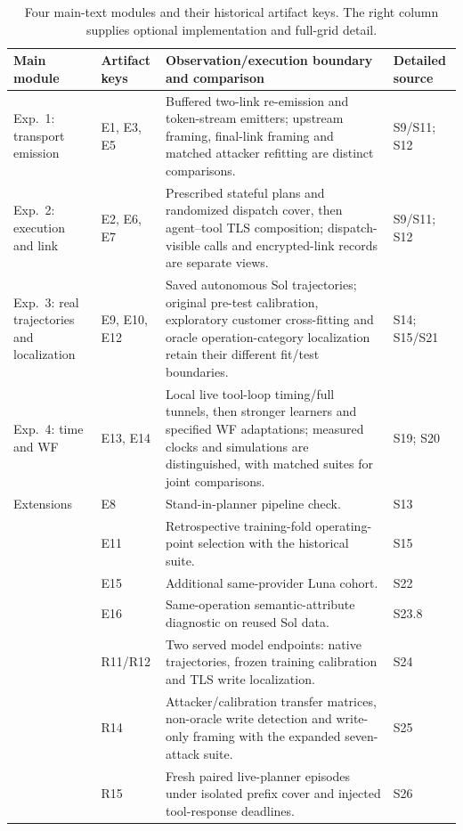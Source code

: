 \begin{table}[!t]\centering\footnotesize
\caption{Four main-text modules and their historical artifact keys. The right column supplies optional implementation and full-grid detail.}\label{tab:r9-experiment-index}
\begin{tabularx}{\textwidth}{@{}p{}p{}Xp{}@{}}\toprule
Main module & Artifact keys & Observation/execution boundary and comparison & Detailed source\\\midrule
Exp.\ 1: transport emission & E1, E3, E5 & Buffered two-link re-emission and token-stream emitters; upstream framing, final-link framing and matched attacker refitting are distinct comparisons. & S9/S11; S12\\
Exp.\ 2: execution and link & E2, E6, E7 & Prescribed stateful plans and randomized dispatch cover, then agent--tool TLS composition; dispatch-visible calls and encrypted-link records are separate views. & S9/S11; S12\\
Exp.\ 3: real trajectories and localization & E9, E10, E12 & Saved autonomous Sol trajectories; original pre-test calibration, exploratory customer cross-fitting and oracle operation-category localization retain their different fit/test boundaries. & S14; S15/S21\\
Exp.\ 4: time and WF & E13, E14 & Local live tool-loop timing/full tunnels, then stronger learners and specified WF adaptations; measured clocks and simulations are distinguished, with matched suites for joint comparisons. & S19; S20\\\midrule
Extensions & E8 & Stand-in-planner pipeline check. & S13\\
& E11 & Retrospective training-fold operating-point selection with the historical suite. & S15\\
& E15 & Additional same-provider Luna cohort. & S22\\
& E16 & Same-operation semantic-attribute diagnostic on reused Sol data. & S23.8\\
& R11/R12 & Two served model endpoints: native trajectories, frozen training calibration and TLS write localization. & S24\\
& R14 & Attacker/calibration transfer matrices, non-oracle write detection and write-only framing with the expanded seven-attack suite. & S25\\
& R15 & Fresh paired live-planner episodes under isolated prefix cover and injected tool-response deadlines. & S26\\\bottomrule
\end{tabularx}\end{table}

